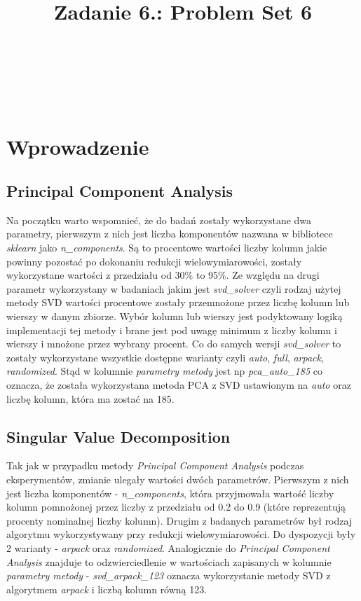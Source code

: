 \documentclass{classrep}
\author{%
    \studentinfo[239661@edu.p.lodz.pl]{Szymon Gruda}{239661}\\
    \studentinfo[239671@edu.p.lodz.pl]{Jan Karwowski}{239671}\\
    \studentinfo[239673@edu.p.lodz.pl]{Michał Kidawa}{239673}\\
    \studentinfo[239676@edu.p.lodz.pl]{Kamil Kowalewski}{239676}\\
}
\title{Zadanie 6.: Problem Set 6}
\begin{document}
    \maketitle
    \thispagestyle{fancyplain}

    \newpage
    \tableofcontents
    \newpage

    \section{Wprowadzenie}
    \label{intro} {

        \subsection{Principal Component Analysis} {
            Na początku warto wspomnieć, że do badań zostały wykorzystane dwa parametry,
            pierwszym z nich jest liczba komponentów nazwana w bibliotece
            \textit{sklearn} jako \textit{n\_components}. Są to procentowe wartości
            liczby kolumn jakie powinny pozostać po dokonaniu redukcji
            wielowymiarowości, zostały wykorzystane wartości z przedziału od 30\% to 95\%.
            Ze względu na drugi parametr wykorzystany w badaniach jakim jest
            \textit{svd\_solver} czyli rodzaj użytej metody SVD wartości procentowe
            zostały przemnożone przez liczbę kolumn lub wierszy w danym zbiorze. Wybór
            kolumn lub wierszy jest podyktowany logiką implementacji tej metody i brane
            jest pod uwagę minimum z liczby kolumn i wierszy i mnożone przez wybrany
            procent. Co do samych wersji \textit{svd\_solver} to zostały wykorzystane
            wszystkie dostępne warianty czyli \textit{auto}, \textit{full},
            \textit{arpack}, \textit{randomized}. Stąd w kolumnie
            \textit{parametry metody} jest np \textit{pca\_auto\_185} co oznacza, że
            została wykorzystana metoda PCA z SVD ustawionym na \textit{auto} oraz liczbę
            kolumn, która ma zostać na 185.
        }
        \subsection{Singular Value Decomposition} {
            Tak jak w przypadku metody \textit{Principal Component Analysis} podczas eksperymentów, zmianie ulegały wartości dwóch parametrów. Pierwszym z nich jest liczba komponentów - \textit{n\_components}, która przyjmowała wartość liczby kolumn pomnożonej przez liczby z przedziału od 0.2 do 0.9 (które reprezentują procenty nominalnej liczby kolumn). Drugim z badanych parametrów był rodzaj algorytmu wykorzystywany przy redukcji wielowymiarowości. Do dyspozycji były 2 warianty - \textit{arpack} oraz \textit{randomized}. Analogicznie do \textit{Principal Component Analysis} znajduje to odzwierciedlenie w wartościach zapisanych w kolumnie \textit{parametry metody} - \textit{svd\_arpack\_123} oznacza wykorzystanie metody SVD z algorytmem \textit{arpack} i liczbą kolumn równą 123.
        }
}
\end{document}
